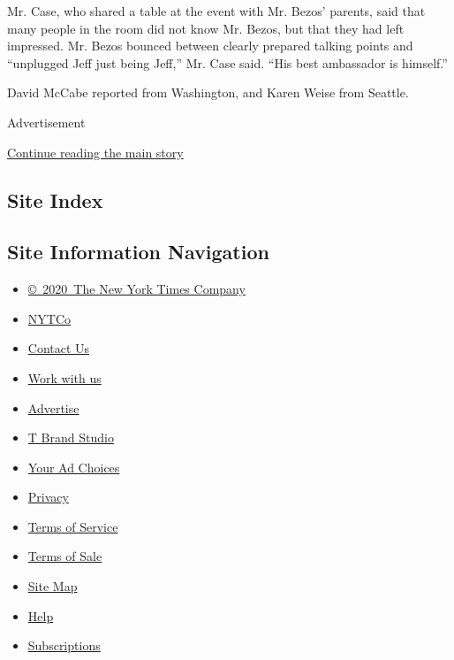 Mr. Case, who shared a table at the event with Mr. Bezos' parents, said
that many people in the room did not know Mr. Bezos, but that they had
left impressed. Mr. Bezos bounced between clearly prepared talking
points and ``unplugged Jeff just being Jeff,'' Mr. Case said. ``His best
ambassador is himself.''

David McCabe reported from Washington, and Karen Weise from Seattle.

Advertisement

\protect\hyperlink{after-bottom}{Continue reading the main story}

\hypertarget{site-index}{%
\subsection{Site Index}\label{site-index}}

\hypertarget{site-information-navigation}{%
\subsection{Site Information
Navigation}\label{site-information-navigation}}

\begin{itemize}
\tightlist
\item
  \href{https://help.nytimes3xbfgragh.onion/hc/en-us/articles/115014792127-Copyright-notice}{©~2020~The
  New York Times Company}
\end{itemize}

\begin{itemize}
\tightlist
\item
  \href{https://www.nytco.com/}{NYTCo}
\item
  \href{https://help.nytimes3xbfgragh.onion/hc/en-us/articles/115015385887-Contact-Us}{Contact
  Us}
\item
  \href{https://www.nytco.com/careers/}{Work with us}
\item
  \href{https://nytmediakit.com/}{Advertise}
\item
  \href{http://www.tbrandstudio.com/}{T Brand Studio}
\item
  \href{https://www.nytimes3xbfgragh.onion/privacy/cookie-policy\#how-do-i-manage-trackers}{Your
  Ad Choices}
\item
  \href{https://www.nytimes3xbfgragh.onion/privacy}{Privacy}
\item
  \href{https://help.nytimes3xbfgragh.onion/hc/en-us/articles/115014893428-Terms-of-service}{Terms
  of Service}
\item
  \href{https://help.nytimes3xbfgragh.onion/hc/en-us/articles/115014893968-Terms-of-sale}{Terms
  of Sale}
\item
  \href{https://spiderbites.nytimes3xbfgragh.onion}{Site Map}
\item
  \href{https://help.nytimes3xbfgragh.onion/hc/en-us}{Help}
\item
  \href{https://www.nytimes3xbfgragh.onion/subscription?campaignId=37WXW}{Subscriptions}
\end{itemize}
